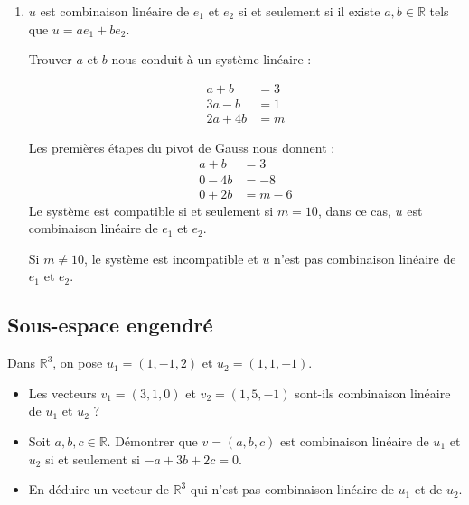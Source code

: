 {\begin{mdframed}
\begin{enumerate}
    Les premières étapes du pivot de Gauss nous donnent : 
    \begin{align*}
      a + b &= 2 \\
      0 - 4b &= 1 \\
      0 + 2b &= -1
    \end{align*}
    Le système est donc incompatible et $u$ n'est pas combinaison linéaire de $e_1$ et $e_2$.

    \item $u$ est combinaison linéaire de $e_1$ et $e_2$ si et seulement si il existe $a, b \in \mathbb{R}$ tels que $u=a e_1 + b e_2$.

    Trouver $a$ et $b$ nous conduit à un système linéaire : 

    \begin{align*}
      a + b &= 3 \\
      3a - b &= 1 \\
      2a + 4 b &= m
    \end{align*}

    Les premières étapes du pivot de Gauss nous donnent : 
    \begin{align*}
      a + b &= 3 \\
      0 - 4b &= -8 \\
      0 + 2b &= m-6
    \end{align*}
    Le système est compatible si et seulement si $m = 10$, dans ce cas, $u$ est combinaison linéaire de $e_1$ et $e_2$.

    Si $m \neq 10$, le système est incompatible et $u$ n'est pas combinaison linéaire de $e_1$ et $e_2$.
  \end{enumerate}
\end{mdframed}
}{}
\vspace{2em}
\subsection{Sous-espace engendré}


Dans $\mathbb{R}^3$, on pose $u_1=(1, -1, 2)$ et $u_2=(1, 1, -1)$.
\begin{itemize}
    \item Les vecteurs $v_1=(3, 1, 0)$ et $v_2=(1, 5, -1)$ sont-ils combinaison linéaire de $u_1$ et $u_2$ ?
    \item Soit $a, b, c \in \mathbb{R}$. Démontrer que $v=(a, b, c)$ est combinaison linéaire de $u_1$ et $u_2$ si et seulement si $-a+3 b+2 c=0$.
    \item En déduire un vecteur de $\mathbb{R}^3$ qui n'est pas combinaison linéaire de $u_1$ et de $u_2$.
\end{itemize}

